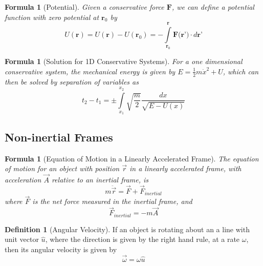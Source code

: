 \documentclass[12pt]{article}
\newtheorem{for}[thm]{Formula}
\theoremstyle{definition}
\newtheorem{defn}[thm]{Definition}
\theoremstyle{remark}
\numberwithin{equation}{section}
\newcommand\B[1]{\textbf{#1}}
\begin{document}
\begin{for}[Potential]
        Given a conservative force $\B{F}$, we can define a potential function with zero potential at $\B{r}_0$ by \begin{equation}
                U(\B{r}) = U(\B{r}) - U(\B{r}_0) = -\int\limits_{\B{r}_0}^{\B{r}}\B{F(r')}\cdot d\B{r'}
        \end{equation}
\end{for}

\vspace{15pt}

\begin{for}[Solution for 1D Conservative Systems]
        For a one dimensional conservative system, the mechanical energy is given by $E = \frac{1}{2}m\dot{x}^2+U$, which can then be solved by separation of variables as \begin{equation}
                t_2 - t_1 = \pm \int\limits_{x_1}^{x_2}\sqrt{\frac{m}{2}}\frac{dx}{\sqrt{E-U(x)}}
        \end{equation}
\end{for}

\vspace{15pt}


\subsection{Non-inertial Frames}

\begin{for}[Equation of Motion in a Linearly Accelerated Frame]
        The equation of motion for an object with position $\vec{r}$ in a linearly accelerated frame, with acceleration $\vec{A}$ relative to an inertial frame, is \begin{equation}
                m\ddot{\vec{r}} = \vec{F} + \vec{F}_{inertial}
        \end{equation}
        where $\vec{F}$ is the net force measured in the inertial frame, and \begin{equation}
                \vec{F}_{inertial} = -m\vec{A}
        \end{equation}
\end{for}


\vspace{15pt}


\begin{defn}[Angular Velocity]
        If an object is rotating about an a line with unit vector $\hat{u}$, where the direction is given by the right hand rule, at a rate $\omega$, then its angular velocity is given by \begin{equation}
                \vec{\omega} = \omega\hat{u}
        \end{equation}
\end{defn}
\end{document}
